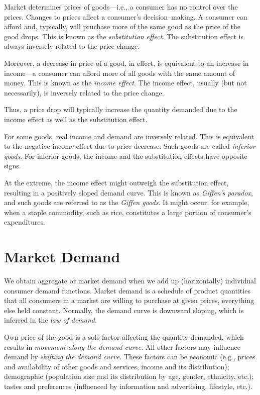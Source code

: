\documentclass[]{book}
\begin{document}
Market determines prices of goods---i.e., a consumer has no control over
the prices. Changes to prices affect a consumer's decision--making. A
consumer can afford and, typically, will pruchase more of the same good
as the price of the good drops. This is known as the \emph{substitution
effect}. The substitution effect is always inversely related to the
price change.

Moreover, a decrease in price of a good, in effect, is equivalent to an
increase in income---a consumer can afford more of all goods with the
same amount of money. This is known as the \emph{income effect}. The
income effect, usually (but not necessarily), is inversely related to
the price change.

Thus, a price drop will typically increase the quantity demanded due to
the income effect as well as the substitution effect.

For some goods, real income and demand are inversely related. This is
equivalent to the negative income effect due to price decrease. Such
goods are called \emph{inferior goods}. For inferior goods, the income
and the substitution effects have opposite signs.

At the extreme, the income effect might outweigh the substitution
effect, resulting in a positively sloped demand curve. This is known as
\emph{Giffen's paradox}, and such goods are referred to as the
\emph{Giffen goods}. It might occur, for example, when a staple
commodity, such as rice, constitutes a large portion of consumer's
expenditures.

\section{Market Demand}\label{market-demand}

We obtain aggregate or market demand when we add up (horizontally)
individual consumer demand functions. Market demand is a schedule of
product quantities that all consumers in a market are willing to
purchase at given prices, everything else held constant. Normally, the
demand curve is downward sloping, which is inferred in the \emph{law of
demand}.

Own price of the good is a sole factor affecting the quantity demanded,
which results in \emph{movement along the demand curve}. All other
factors may influence demand by \emph{shifting the demand curve}. These
factors can be economic (e.g., prices and availability of other goods
and services, income and its distribution); demographic (population size
and its distribution by age, gender, ethnicity, etc.); tastes and
preferences (influenced by information and advertising, lifestyle,
etc.).
\end{document}
